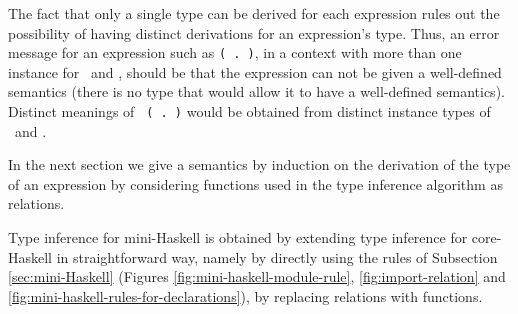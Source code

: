 The fact that only a single type can be derived for each expression
rules out the possibility of having distinct derivations for an
expression's type. Thus, an error message for an expression such as
{\tt (\sshow\ $\!\!$.$\!\!$ \rread)}, in a context with more than one
instance for \SShow\ and \RRead, should be that the expression can not
be given a well-defined semantics (there is no type that would allow
it to have a well-defined semantics). Distinct meanings of {\tt
  (\sshow\ $\!\!$.$\!\!$ \rread)} would be obtained from distinct
instance types of \sshow\ and \rread.

In the next section we give a semantics by induction on the derivation
of the type of an expression by considering functions used in the type
inference algorithm as relations.

Type inference for mini-Haskell is obtained by extending type
inference for core-Haskell in straightforward way, namely by directly
using the rules of Subsection \ref{sec:mini-Haskell} (Figures
\ref{fig:mini-haskell-module-rule}, \ref{fig:import-relation} and
\ref{fig:mini-haskell-rules-for-declarations}), by replacing relations
with functions.


